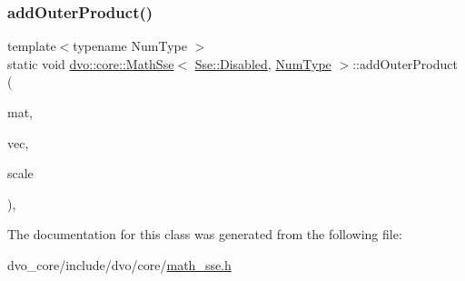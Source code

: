 \subsubsection{\texorpdfstring{add\+Outer\+Product()}{addOuterProduct()}}
{\footnotesize\ttfamily template$<$typename Num\+Type $>$ \\
static void \mbox{\hyperlink{classdvo_1_1core_1_1_math_sse}{dvo\+::core\+::\+Math\+Sse}}$<$ \mbox{\hyperlink{structdvo_1_1core_1_1_sse_a4fd9b55a1ec035f837cc78f33d45a9adaeeb0a9210cb89d05bec4d9b12e628ae3}{Sse\+::\+Disabled}}, \mbox{\hyperlink{namespacedvo_1_1core_ab9c199d221775a923e2549ad7e15c323}{Num\+Type}} $>$\+::add\+Outer\+Product (\begin{DoxyParamCaption}\item[{Eigen\+::\+Matrix$<$ \mbox{\hyperlink{namespacedvo_1_1core_ab9c199d221775a923e2549ad7e15c323}{Num\+Type}}, 6, 6 $>$ \&}]{mat,  }\item[{const Eigen\+::\+Matrix$<$ \mbox{\hyperlink{namespacedvo_1_1core_ab9c199d221775a923e2549ad7e15c323}{Num\+Type}}, 6, 1 $>$ \&}]{vec,  }\item[{const \mbox{\hyperlink{namespacedvo_1_1core_ab9c199d221775a923e2549ad7e15c323}{Num\+Type}} \&}]{scale }\end{DoxyParamCaption})\hspace{0.3cm}{\ttfamily [inline]}, {\ttfamily [static]}}



The documentation for this class was generated from the following file\+:\begin{DoxyCompactItemize}
\item 
dvo\+\_\+core/include/dvo/core/\mbox{\hyperlink{math__sse_8h}{math\+\_\+sse.\+h}}\end{DoxyCompactItemize}
